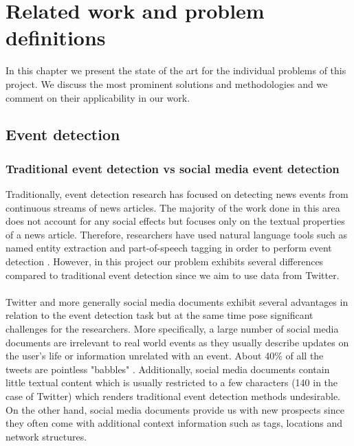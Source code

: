 
\chapter{Related work and problem definitions}\label{RelatedWork}
\ifpdf
    \graphicspath{{Chapter1/Chapter1Figs/PNG/}{Chapter1/Chapter1Figs/PDF/}{Chapter1/Chapter1Figs/}}
\else
    \graphicspath{{Chapter1/Chapter1Figs/EPS/}{Chapter1/Chapter1Figs/}}
\fi
In this chapter we present the state of the art for the individual problems of this project. We discuss the most
prominent solutions and methodologies and we comment on their applicability in our work.
\section{Event detection }\label{sec:EventDetectionBack}
\subsection{Traditional event detection vs social media event detection}\label{sec:DifferencesBetweentraditional}

Traditionally, event detection research has focused on detecting news events from continuous streams of news articles. The majority of the work done in this area does not account for any social effects but focuses only on the textual properties of a news article. Therefore, researchers have used natural language tools such as named entity extraction and part-of-speech tagging in order to perform event detection \citep{Becker_eventidentification}. However, in this project our problem exhibits several differences compared to traditional event detection since we aim to use data from Twitter.\\\\
Twitter and more generally social media documents exhibit several advantages in relation to the event detection task but at the same time pose significant challenges for the researchers. More specifically, a large number of social media documents are irrelevant to real world events as they usually describe updates on the user's life or information unrelated with an event. About 40\% of all the tweets are pointless "babbles" \citep{conf/icwsm/WengL11}. Additionally, social media documents contain little textual content which is usually restricted to a few characters (140 in the case of Twitter) which renders traditional event detection methods undesirable. On the other hand, social media documents provide us with new prospects since they often come with additional context information such as tags, locations and network structures.
	
